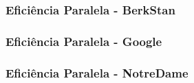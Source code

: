 \documentclass{beamer}
\begin{document}
\begin{frame}
    \frametitle{Eficiência Paralela - BerkStan}

    \begin{figure}
        \centering
    \end{figure}
\end{frame}

\begin{frame}
    \frametitle{Eficiência Paralela - Google}

    \begin{figure}
        \centering
    \end{figure}
\end{frame}

\begin{frame}
    \frametitle{Eficiência Paralela - NotreDame}

    \begin{figure}
        \centering
    \end{figure}
\end{frame}
\end{document}
